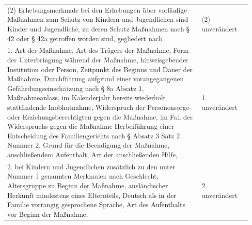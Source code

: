 \documentclass[10pt,a4paper,landscape]{article}
\begin{document}
\begin{longtable}{|L{8.2cm}|L{8.2cm}|L{8.2cm}|}
\hhline{|---|}
(2) Erhebungsmerkmale bei den  \newline Erhebungen über vorläufige Maßnahmen  \newline zum Schutz von Kindern und Jugendlichen  \newline sind Kinder und Jugendliche, zu deren  \newline Schutz Maßnahmen nach \S{} 42 oder \S{} 42a  \newline getroffen worden sind, gegliedert nach & (2) unverändert &  \\
\hhline{|---|}
1.   \newline Art der Maßnahme, Art des Trägers der  \newline Maßnahme, Form der Unterbringung  \newline während der Maßnahme, hinweisgebender  \newline Institution oder Person, Zeitpunkt des  \newline Beginns und Dauer der Maßnahme,  \newline Durchführung aufgrund einer  \newline vorangegangenen  \newline Gefährdungseinschätzung nach \S{} 8a  \newline Absatz 1, Maßnahmeanlass, im  \newline Kalenderjahr bereits wiederholt  \newline stattfindende Inobhutnahme, Widerspruch  \newline der Personensorge- oder  \newline Erziehungsberechtigten gegen die  \newline Maßnahme, im Fall des Widerspruchs  \newline gegen die Maßnahme Herbeiführung einer  \newline Entscheidung des Familiengerichts nach \S{}   Absatz 3 Satz 2 Nummer 2, Grund für  \newline die Beendigung der Maßnahme,  \newline anschließendem Aufenthalt, Art der  \newline anschließenden Hilfe, & 1. unverändert &  \\
\hhline{|---|}
2.   \newline bei Kindern und Jugendlichen zusätzlich zu  \newline den unter Nummer 1 genannten  \newline Merkmalen nach Geschlecht, Altersgruppe  \newline zu Beginn der Maßnahme, ausländischer  \newline Herkunft mindestens eines Elternteils,  \newline Deutsch als in der Familie vorrangig  \newline gesprochene Sprache, Art des Aufenthalts  \newline vor Beginn der Maßnahme. & 2. unverändert &  \\

\end{longtable}
\end{document}
